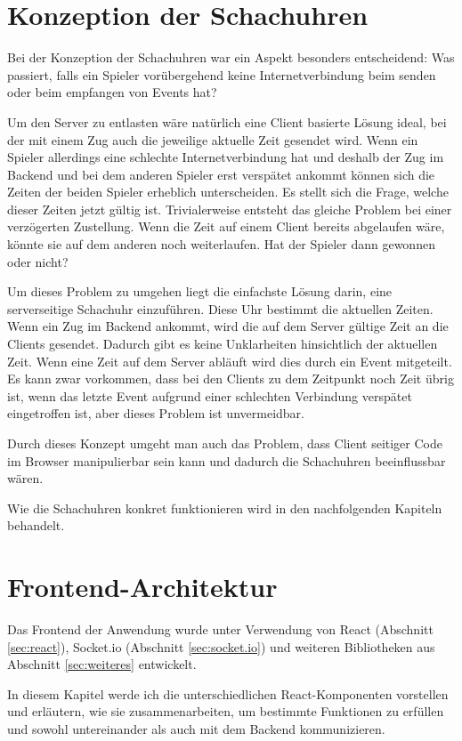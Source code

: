 \section{Konzeption der Schachuhren}
\label{sec:Konzept-Schachuhr}
Bei der Konzeption der Schachuhren war ein Aspekt besonders entscheidend: Was passiert, falls ein Spieler vorübergehend keine Internetverbindung beim senden oder beim empfangen von Events hat?

Um den Server zu entlasten wäre natürlich eine Client basierte Lösung ideal, bei der mit einem Zug auch die jeweilige aktuelle Zeit gesendet wird. Wenn ein Spieler allerdings eine schlechte Internetverbindung hat und deshalb der Zug im Backend und bei dem anderen Spieler erst verspätet ankommt können sich die Zeiten der beiden Spieler erheblich unterscheiden. Es stellt sich die Frage, welche dieser Zeiten jetzt gültig ist. Trivialerweise entsteht das gleiche Problem bei einer verzögerten Zustellung. Wenn die Zeit auf einem Client bereits abgelaufen wäre, könnte sie auf dem anderen noch weiterlaufen. Hat der Spieler dann gewonnen oder nicht?

Um dieses Problem zu umgehen liegt die einfachste Lösung darin, eine serverseitige Schachuhr einzuführen. Diese Uhr bestimmt die aktuellen Zeiten. Wenn ein Zug im Backend ankommt, wird die auf dem Server gültige Zeit an die Clients gesendet. Dadurch gibt es keine Unklarheiten hinsichtlich der aktuellen Zeit. Wenn eine Zeit auf dem Server abläuft wird dies durch ein Event mitgeteilt.  Es kann zwar vorkommen, dass bei den Clients zu dem Zeitpunkt noch Zeit übrig ist, wenn das letzte Event aufgrund einer schlechten Verbindung verspätet eingetroffen ist, aber dieses Problem ist unvermeidbar.

Durch dieses Konzept umgeht man auch das Problem, dass Client seitiger Code im Browser manipulierbar sein kann und dadurch die Schachuhren beeinflussbar wären.

Wie die Schachuhren konkret funktionieren wird in den nachfolgenden Kapiteln behandelt.

    \section{Frontend-Architektur}
Das Frontend der Anwendung wurde unter Verwendung von React (Abschnitt \ref{sec:react}), Socket.io (Abschnitt \ref{sec:socket.io}) und weiteren Bibliotheken aus Abschnitt \ref{sec:weiteres} entwickelt.



In diesem Kapitel werde ich die unterschiedlichen React-Komponenten vorstellen und erläutern, wie sie zusammenarbeiten, um bestimmte Funktionen zu erfüllen und sowohl untereinander als auch mit dem Backend kommunizieren.

